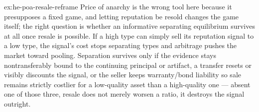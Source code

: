 \documentclass[11pt,a4paper]{article}
\theoremstyle{definition}
\theoremstyle{definition}
\theoremstyle{remark}
\begin{document}
\begin{pdsolution}{ex:he-poa-resale-reframe}
Price of anarchy is the wrong tool here because it presupposes a fixed
game, and letting reputation be resold changes the game itself; the right
question is whether an informative separating equilibrium survives at all once
resale is possible. If a high type can simply sell its reputation signal to a
low type, the signal's cost stops separating types and arbitrage pushes the
market toward pooling. Separation survives only if the evidence stays
nontransferably bound to the continuing principal or artifact, a transfer resets
or visibly discounts the signal, or the seller keeps warranty/bond liability so
sale remains strictly costlier for a low-quality asset than a high-quality one
--- absent one of those three, resale does not merely worsen a ratio, it
destroys the signal outright.
\end{pdsolution}

\end{document}
